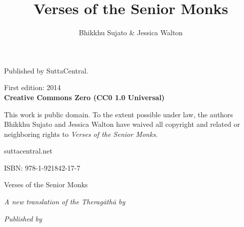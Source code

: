 \documentclass[10pt, openany]{book}
\title{Verses of the Senior Monks}
\author{Bhikkhu Sujato \& Jessica Walton}
\date{}
\begin{document}
\frontmatter

\pagestyle{empty}

\maketitle

\newpage

\setlength{\parindent}{0cm}
\begin{small}

Published by SuttaCentral.

\medskip

First edition: 2014\\

\textbf{Creative Commons Zero (CC0 1.0 Universal)}

This work is public domain. To the extent possible under law, the authors Bhikkhu Sujato and Jessica Walton have waived all copyright and related or neighboring rights to \emph{Verses of the Senior Monks}.

\bigskip

\begin{center}{\sffamily suttacentral.net}\end{center}


ISBN: 978-1-921842-17-7

\end{small}

\newpage



\begin{center}\end{center}

\begin{center}

{\LARGE Verses of the Senior Monks}

\vfill

\emph{\large A new translation of the Theragāthā by}

\medskip

\MakeLowercase{}

\medskip

\MakeLowercase{}


\vfill
\emph{Published by}

\medskip



\end{center}

\setlength{\parindent}{1.5em}
\end{document}
